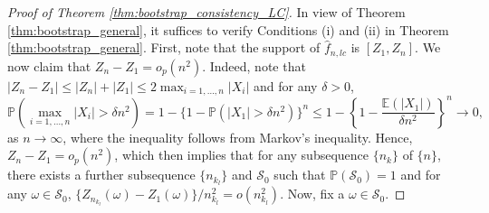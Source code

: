 \documentclass[12pt,letterpaper, twoside, openany]{article}
\theoremstyle{plain}
\begin{document}
\begin{proof}[Proof of Theorem \ref{thm:bootstrap_consistency_LC}]
In view of Theorem \ref{thm:bootstrap_general}, it suffices  to verify Conditions (i) and (ii) in  Theorem \ref{thm:bootstrap_general}.
%
%
First, note that the support of $\hat{f}_{n, lc}$ is $[Z_1, Z_n]$. We now claim that $Z_n - Z_1 = o_p(n^2)$. Indeed, note that $|Z_n - Z_1| \leq |Z_n| + |Z_1| \leq 2 \max_{i=1,\ldots,n}|X_i|$ and for any $\delta > 0$,
\begin{equation*}
	\mathbb{P}\left(\max_{i=1,\ldots,n} |X_i| > \delta n^2\right) = 1 - \{ 1- \mathbb{P}(|X_1| > \delta n^2) \}^n \leq 1- \left\{ 1- \frac{\mathbb{E}(|X_1|)}{\delta n^2} \right\}^n \rightarrow 0,
\end{equation*}
as $n \rightarrow \infty$, where the inequality follows from Markov's inequality. Hence, $Z_n - Z_1 = o_p(n^2)$, which then implies that for any subsequence $\{n_k\}$ of $\{n\}$, there exists a further subsequence $\{n_{k_l}\}$ and $\mathcal{S}_0$ such that $\mathbb{P}(\mathcal{S}_0) = 1$ and for any $\omega \in \mathcal{S}_0$,  $\{Z_{n_{k_l}}(\omega)-Z_1(\omega)\}/n^{2}_{k_l} = o(n^2_{k_l})$.
Now, fix a $\omega \in \mathcal{S}_0$.

\end{proof}
\end{document}
